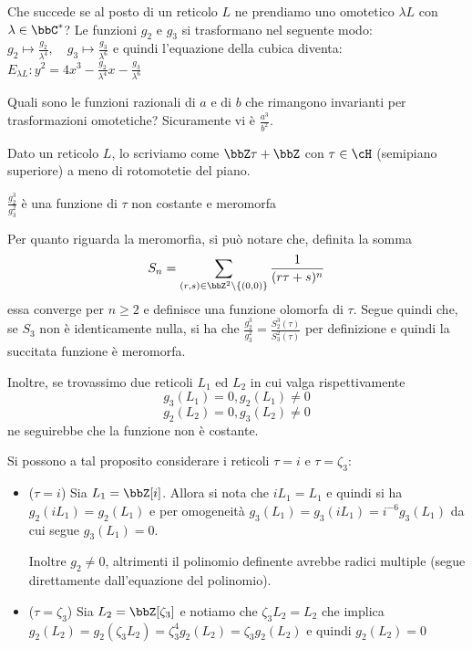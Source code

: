 Che succede se al posto di un reticolo $L$ ne prendiamo uno omotetico
$\lambda L$ con $\lambda \in \bbC^*$? Le funzioni $g_2$ e $g_3$ si
trasformano nel seguente modo:
$ g_2 \mapsto \frac{g_2}{\lambda^4} ,\quad g_3 \mapsto
\frac{g_3}{\lambda^6}$ e quindi l'equazione della cubica diventa:
$E_{\lambda L}: y^2 = 4x^3 - \frac{g_2}{\lambda^4} x -
\frac{g_3}{\lambda^6}$

Quali sono le funzioni razionali di $a$ e di $b$ che rimangono
invarianti per trasformazioni omotetiche? Sicuramente vi è
$\frac{a^3}{b^2}$.

Dato un reticolo $L$, lo scriviamo come $\bbZ \tau + \bbZ$ con $\tau \in
\cH$ (semipiano superiore) a meno di rotomotetie del piano.

\begin{proposizione}
  $\frac{g_2^3}{g_3^2}$ è una funzione di $\tau$ non costante e meromorfa
\end{proposizione}

Per quanto riguarda la meromorfia, si può notare che, definita la somma
$$S_n = \sum_{(r, s) \in \bbZ^2 \setminus \{(0, 0)\}} \frac{1}{(r \tau
  + s)^n}$$ essa converge per $n \ge 2$ e definisce una funzione olomorfa
di $\tau$. Segue quindi che, se $S_3$ non è identicamente nulla, si ha
che $\frac{g_2^3}{g_3^2} = \frac{S_2^3(\tau)}{S_3^2(\tau)}$ per
definizione e quindi la succitata funzione è meromorfa.


Inoltre, se trovassimo due reticoli $L_1$ ed $L_2$ in cui valga
rispettivamente
$$g_3(L_1) = 0, g_2(L_1) \neq 0$$
$$g_2(L_2) = 0, g_3(L_2) \neq 0$$
ne seguirebbe che la funzione non è costante.

Si possono a tal proposito considerare i reticoli $\tau = i$ e
$\tau = \zeta_3$:
\begin{itemize}
\item ($\tau = i$) Sia $L_1 = \bbZ[i]$. Allora si nota che $i L_1 = L_1$
  e quindi si ha $g_2(i L_1) = g_2(L_1)$ e per omogeneità
  $g_3(L_1) = g_3(i L_1) = i^{-6} g_3(L_1)$ da cui segue $g_3(L_1) = 0$.

  Inoltre $g_2 \neq 0$, altrimenti il polinomio definente avrebbe radici
  multiple (segue direttamente dall'equazione del polinomio).

\item ($\tau = \zeta_3$) Sia $L_2 = \bbZ[\zeta_3]$ e notiamo che
  $\zeta_3 L_2 = L_2$ che implica $g_2(L_2) = g_2(\zeta_3 L_2) =
  \zeta_3^4 g_2(L_2) = \zeta_3 g_2(L_2)$ e quindi $g_2(L_2) = 0$
\end{itemize}

